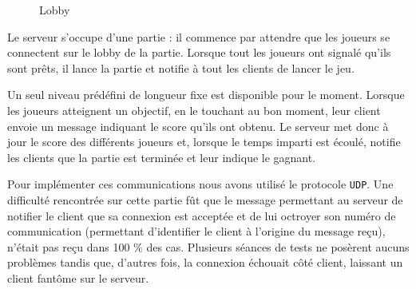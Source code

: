 \begin{figure}
\begin{center}
\end{center}
\caption{Lobby}
\end{figure}

Le serveur s'occupe d'une partie : il commence par attendre que les joueurs se connectent sur le lobby de la partie. Lorsque tout les joueurs ont signalé qu'ils sont prêts, il lance la partie et notifie à tout les clients de lancer le jeu.

Un seul niveau prédéfini de longueur fixe est disponible pour le moment. Lorsque les joueurs atteignent un objectif, en le touchant au bon moment, leur client envoie un message indiquant le score qu'ils ont obtenu. Le serveur met donc à jour le score des différents joueurs et, lorsque le temps imparti est écoulé, notifie les clients que la partie est terminée et leur indique le gagnant.

Pour implémenter ces communications nous avons utilisé le protocole \verb!UDP!. Une difficulté rencontrée sur cette partie fût que le message permettant au serveur de notifier le client que sa connexion est acceptée et de lui octroyer son numéro de communication (permettant d'identifier le client à l'origine du message reçu), n'était pas reçu dans 100 \% des cas. Plusieurs séances de tests ne posèrent aucuns problèmes tandis que, d'autres fois, la connexion échouait côté client, laissant un \og client fantôme \fg{} sur le serveur.

